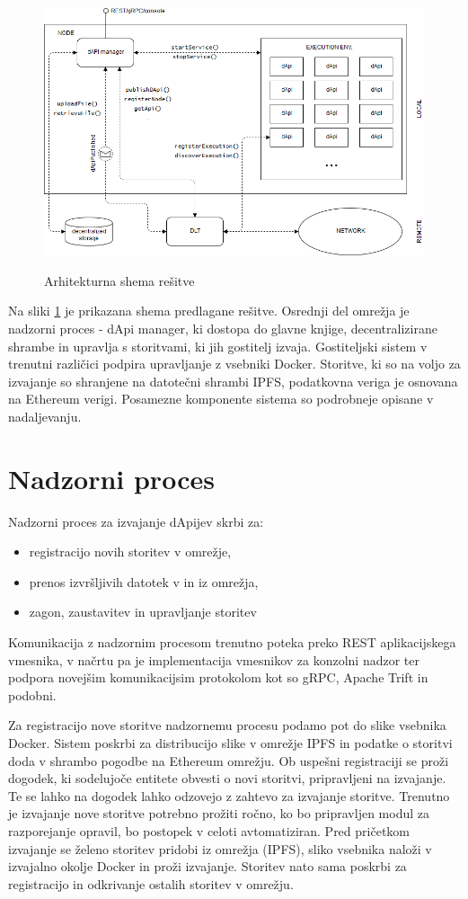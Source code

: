 \documentclass[a4paper, 12pt]{book}
\begin{document}
\begin{figure}[h]
\includegraphics[width=1.0\textwidth]{slike/dApi.png}
\label{scheme}
\caption{Arhitekturna shema rešitve}
\end{figure}

Na sliki \ref{scheme} je prikazana shema predlagane rešitve. Osrednji del omrežja je nadzorni proces - 
dApi manager, ki dostopa do glavne knjige, decentralizirane shrambe in upravlja s storitvami, ki jih gostitelj izvaja.
Gostiteljski sistem v trenutni različici podpira upravljanje z vsebniki Docker.
Storitve, ki so na voljo za izvajanje so shranjene na datotečni shrambi IPFS, podatkovna veriga je 
osnovana na Ethereum verigi. Posamezne komponente sistema so podrobneje opisane v nadaljevanju.

\section{Nadzorni proces}
Nadzorni proces za izvajanje dApijev skrbi za:
\begin{itemize}
	\item registracijo novih storitev v omrežje, 
	\item prenos izvršljivih datotek v in iz omrežja,
	\item zagon, zaustavitev in upravljanje storitev
\end{itemize}

Komunikacija z nadzornim procesom trenutno poteka preko REST aplikacijskega vmesnika, v načrtu pa je implementacija vmesnikov za konzolni nadzor ter podpora novejšim komunikacijsim protokolom kot so gRPC, Apache Trift in podobni.

Za registracijo nove storitve nadzornemu procesu podamo pot do slike vsebnika Docker.
Sistem poskrbi za distribucijo slike v omrežje IPFS in podatke o storitvi doda v shrambo pogodbe na Ethereum omrežju.
Ob uspešni registraciji se proži dogodek, ki sodelujoče entitete obvesti o novi storitvi, pripravljeni na izvajanje.
Te se lahko na dogodek lahko odzovejo z zahtevo za izvajanje storitve.
Trenutno je izvajanje nove storitve potrebno prožiti ročno, ko bo pripravljen modul za razporejanje opravil, bo postopek v celoti avtomatiziran.
Pred pričetkom izvajanje se želeno storitev pridobi iz omrežja (IPFS), sliko vsebnika naloži v izvajalno okolje Docker in proži izvajanje.
Storitev nato sama poskrbi za registracijo in odkrivanje ostalih storitev v omrežju.
\end{document}
